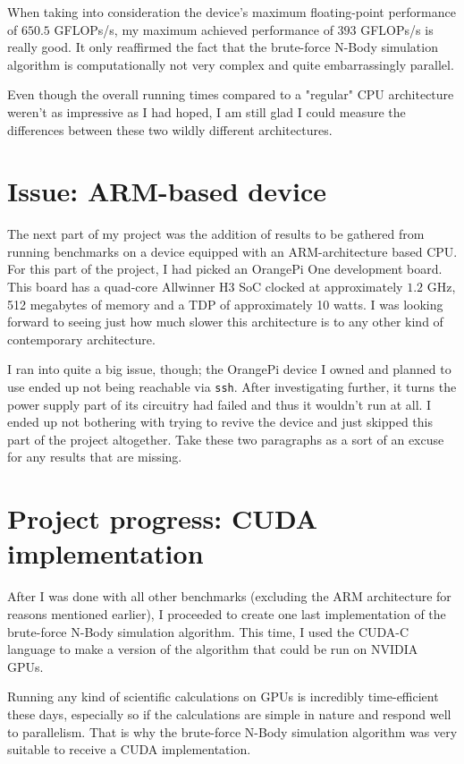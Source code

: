 \documentclass[journal]{IEEEtran}
\begin{document}
			When taking into consideration the device's maximum floating-point performance of $650.5$ GFLOPs/s, my maximum achieved performance of $393$ GFLOPs/s is really good. It only reaffirmed the fact that the brute-force N-Body simulation algorithm is computationally not very complex and quite embarrassingly parallel.
			
			Even though the overall running times compared to a "regular" CPU architecture weren't as impressive as I had hoped, I am still glad I could measure the differences between these two wildly different architectures.
		
	\section{Issue: ARM-based device}
	\label{orangepi}
	
		The next part of my project was the addition of results to be gathered from running benchmarks on a device equipped with an ARM-architecture based CPU. For this part of the project, I had picked an OrangePi One development board. This board has a quad-core Allwinner H3 SoC clocked at approximately $1.2$ GHz, 512 megabytes of memory and a TDP of approximately 10 watts. I was looking forward to seeing just how much slower this architecture is to any other kind of contemporary architecture.
		
		I ran into quite a big issue, though; the OrangePi device I owned and planned to use ended up not being reachable via \texttt{ssh}. After investigating further, it turns the power supply part of its circuitry had failed and thus it wouldn't run at all. I ended up not bothering with trying to revive the device and just skipped this part of the project altogether. Take these two paragraphs as a sort of an excuse for any results that are missing.
	
	\section{Project progress: CUDA implementation}
	\label{cudasection}
	
		After I was done with all other benchmarks (excluding the ARM architecture for reasons mentioned earlier), I proceeded to create one last implementation of the brute-force N-Body simulation algorithm. This time, I used the CUDA-C language to make a version of the algorithm that could be run on NVIDIA GPUs.
		
		Running any kind of scientific calculations on GPUs is incredibly time-efficient these days, especially so if the calculations are simple in nature and respond well to parallelism. That is why the brute-force N-Body simulation algorithm was very suitable to receive a CUDA implementation.
		
\end{document}

